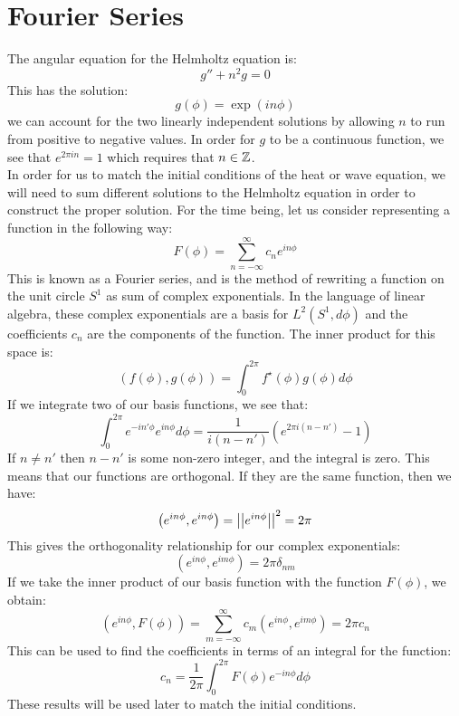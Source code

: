 \documentclass{paper}
\begin{document}
\section{Fourier Series}
The angular equation for the Helmholtz equation is:
\begin{equation}
  g''+n^2 g=0
\end{equation}
This has the solution:
\begin{equation}
  g(\phi) = \exp(i n \phi)
\end{equation}
we can account for the two linearly independent solutions by allowing $n$ to run from positive to negative values. In order for $g$ to be a continuous function, we see that $e^{2\pi i n} = 1$ which requires that $n\in\mathbb{Z}$.\\
In order for us to match the initial conditions of the heat or wave equation, we will need to sum different solutions to the Helmholtz equation in order to construct the proper solution. For the time being, let us consider representing a function in the following way:
\begin{equation}
  F(\phi) = \sum_{n = -\infty}^\infty c_n e^{in\phi}
\end{equation}
This is known as a Fourier series, and is the method of rewriting a function on the unit circle $S^1$ as sum of complex exponentials. In the language of linear algebra, these complex exponentials are a basis for $L^2(S^1,d\phi)$ and the coefficients $c_n$ are the components of the function. The inner product for this space is:
\begin{equation}
  (f(\phi),g(\phi)) = \int_0^{2\pi} f^\star(\phi)g(\phi) d\phi
\end{equation}
If we integrate two of our basis functions, we see that:
\begin{equation}
  \int_0^{2\pi} e^{-i n' \phi} e^{i n \phi} d\phi = \frac{1}{i(n-n')}\left(e^{2\pi i (n-n')} - 1\right)
\end{equation}
If $n\neq n'$ then $n-n'$ is some non-zero integer, and the integral is zero. This means that our functions are orthogonal. If they are the same function, then we have:
\begin{equation}
  \left(e^{in\phi}, e^{i n\phi} \right) = \left|\left| e^{in\phi} \right|\right|^2 = 2\pi
\end{equation}
This gives the orthogonality relationship for our complex exponentials:
\begin{equation}
  \boxed{
  \left(e^{in\phi}, e^{i m\phi} \right) = 2\pi \delta_{nm}
  }
\end{equation}
If we take the inner product of our basis function with the function $F(\phi)$, we obtain:
\begin{equation}
  \left(e^{i n \phi},F(\phi)\right) = \sum_{m = -\infty}^\infty c_m \left(e^{in\phi}, e^{i m\phi} \right) = 2\pi c_n
\end{equation}
This can be used to find the coefficients in terms of an integral for the function:
\begin{equation}
  \boxed{
    c_n = \frac{1}{2\pi}\int_0^{2\pi} F(\phi) e^{-in\phi} d\phi
  }
\end{equation}
These results will be used later to match the initial conditions.
\end{document}
